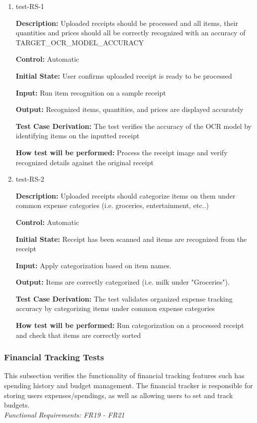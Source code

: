 \documentclass[12pt, titlepage]{article}
\begin{document}
\begin{enumerate}
\item{test-RS-1\\}

\textbf{Description:} Uploaded receipts should be processed and all items, their quantities and prices should all be correctly recognized with an accuracy of TARGET\_OCR\_MODEL\_ACCURACY

\textbf{Control:} Automatic

\textbf{Initial State:} User confirms uploaded receipt is ready to be processed

\textbf{Input:} Run item recognition on a sample receipt

\textbf{Output:} Recognized items, quantities, and prices are displayed accurately

\textbf{Test Case Derivation:} The test verifies the accuracy of the OCR model by identifying items on the inputted receipt

\textbf{How test will be performed:} Process the receipt image and verify recognized details against the original receipt

\item{test-RS-2\\}

\textbf{Description:} Uploaded receipts should categorize items on them under common expense categories (i.e. groceries, entertainment, etc..)

\textbf{Control:} Automatic

\textbf{Initial State:} Receipt has been scanned and items are recognized from the receipt

\textbf{Input:} Apply categorization based on item names.

\textbf{Output:} Items are correctly categorized (i.e. milk under "Groceries").

\textbf{Test Case Derivation:} The test validates organized expense tracking accuracy by categorizing items under common expense categories

\textbf{How test will be performed:} Run categorization on a processed receipt and check that items are correctly sorted
\end{enumerate}

\subsubsection{Financial Tracking Tests}

This subsection verifies the functionality of financial tracking features such has spending history and budget management. The financial tracker is responsible for storing users expenses/spendings, as well as allowing users to set and track budgets.\\
\textit{Functional Requirements: FR19 - FR21}
\end{document}
